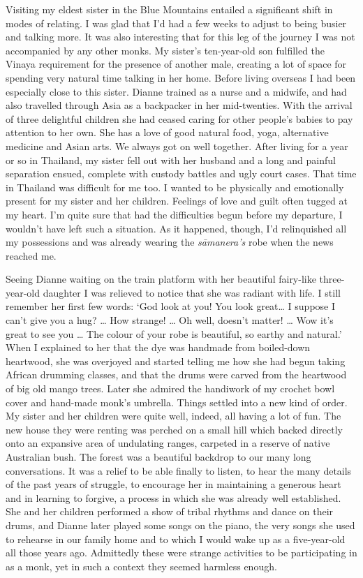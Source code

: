 Visiting my eldest sister in the Blue Mountains entailed a significant
shift in modes of relating. I was glad that I'd had a few weeks to
adjust to being busier and talking more. It was also interesting that
for this leg of the journey I was not accompanied by any other monks. My
sister's ten-year-old son fulfilled the Vinaya requirement for the
presence of another male, creating a lot of space for spending very
natural time talking in her home. Before living overseas I had been
especially close to this sister. Dianne trained as a nurse and a
midwife, and had also travelled through Asia as a backpacker in her
mid-twenties. With the arrival of three delightful children she had
ceased caring for other people's babies to pay attention to her own. She
has a love of good natural food, yoga, alternative medicine and Asian
arts. We always got on well together. After living for a year or so in
Thailand, my sister fell out with her husband and a long and painful
separation ensued, complete with custody battles and ugly court cases. 
That time in Thailand was difficult for me too. I wanted to be
physically and emotionally present for my sister and her children. 
Feelings of love and guilt often tugged at my heart. I'm quite sure that
had the difficulties begun before my departure, I wouldn't have left
such a situation. As it happened, though, I'd relinquished all my
possessions and was already wearing the \emph{sāmanera's} robe when the
news reached me. 

Seeing Dianne waiting on the train platform with her beautiful
fairy-like three-year-old daughter I was relieved to notice that she was
radiant with life. I still remember her first few words: `God look at
you! You look great\ldots{} I suppose I can't give you a hug? \ldots{}
How strange! \ldots{} Oh well, doesn't matter! \ldots{} Wow it's great
to see you \ldots{} The colour of your robe is beautiful, so earthy and
natural.' When I explained to her that the dye was handmade from
boiled-down heartwood, she was overjoyed and started telling me how she
had begun taking African drumming classes, and that the drums were
carved from the heartwood of big old mango trees. Later she admired the
handiwork of my crochet bowl cover and hand-made monk's umbrella. Things
settled into a new kind of order. My sister and her children were quite
well, indeed, all having a lot of fun. The new house they were renting
was perched on a small hill which backed directly onto an expansive area
of undulating ranges, carpeted in a reserve of native Australian bush. 
The forest was a beautiful backdrop to our many long conversations. It
was a relief to be able finally to listen, to hear the many details of
the past years of struggle, to encourage her in maintaining a generous
heart and in learning to forgive, a process in which she was already
well established. She and her children performed a show of tribal
rhythms and dance on their drums, and Dianne later played some songs on
the piano, the very songs she used to rehearse in our family home and to
which I would wake up as a five-year-old all those years ago. Admittedly
these were strange activities to be participating in as a monk, yet in
such a context they seemed harmless enough. 

